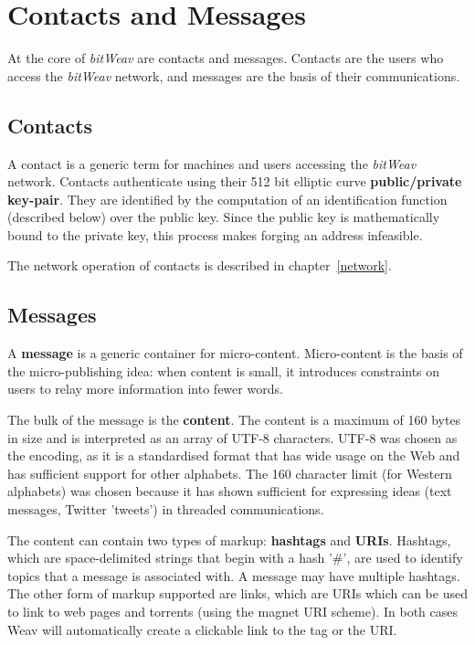 \documentclass[10pt,a4paper,onecolumn]{article}
\begin{document}
\section{Contacts and Messages}
\label{ContactsAndMessages}
At the core of \textit{bitWeav} are contacts and messages. Contacts are the users who access the \textit{bitWeav} network, and messages are the basis of their communications.

\subsection*{Contacts}
A contact is a generic term for machines and users accessing the \textit{bitWeav} network. Contacts authenticate using their 512 bit elliptic curve \textbf{public/private key-pair}. They are identified by the computation of an identification function (described below) over the public key. Since the public key is mathematically bound to the private key, this process makes forging an address infeasible.

The network operation of contacts is described in chapter~\ref{network}.

\subsection*{Messages}
A \textbf{message} is a generic container for micro-content. Micro-content is the basis of the micro-publishing idea: when content is small, it introduces constraints on users to relay more information into fewer words.

The bulk of the message is the \textbf{content}. The content is a maximum of 160 bytes in size and is interpreted as an array of UTF-8 characters. UTF-8 was chosen as the encoding, as it is a standardised format that has wide usage on the Web and has sufficient support for other alphabets. The 160 character limit (for Western alphabets) was chosen because it has shown sufficient for expressing ideas (text messages, Twitter 'tweets') in threaded communications. 

The content can contain two types of markup: \textbf{hashtags} and \textbf{URIs}. Hashtags, which are space-delimited strings that begin with a hash '\#', are used to identify topics that a message is associated with. A message may have multiple hashtags. The other form of markup supported are links, which are URIs which can be used to link to web pages and torrents (using the magnet URI scheme). In both cases Weav will automatically create a clickable link to the tag or the URI.
\end{document}
